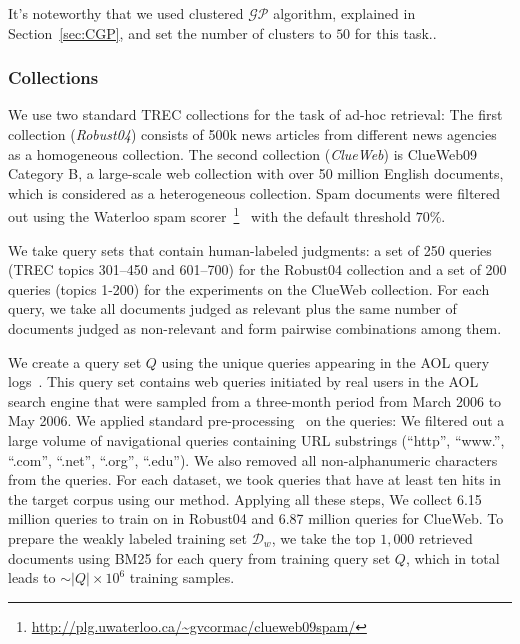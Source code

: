It's noteworthy that we used clustered $\mathcal{GP}$ algorithm, explained in Section~\ref{sec:CGP}, and set the number of clusters to $50$ for this task..  


\subsubsection{Collections}
We use two standard TREC collections for the task of ad-hoc retrieval: The first collection (\emph{Robust04}) consists of 500k news articles from different news agencies as a homogeneous collection. The second collection (\emph{ClueWeb}) is ClueWeb09 Category B, a large-scale web collection with over 50 million English documents, which is considered as a heterogeneous collection. Spam documents were filtered out using the Waterloo spam scorer~\footnote{\url{http://plg.uwaterloo.ca/~gvcormac/clueweb09spam/}}~\citep{Cormack:2011} with the default threshold $70\%$. 

We take query sets that contain human-labeled judgments: a set of 250 queries (TREC topics 301--450 and 601--700) for the Robust04 collection and a set of 200 queries (topics 1-200) for the experiments on the ClueWeb collection.
For each query, we take all documents judged as relevant plus the same number of documents judged as non-relevant and form pairwise combinations among them.

We create a query set $Q$ using the unique queries appearing in the AOL query logs~\citep{Pass:2006}. 
This query set contains web queries initiated by real users in the AOL search engine that were sampled from a three-month period from March 2006 to May 2006. 
We applied standard pre-processing~\cite{Dehghani:2017:SIGIR,Dehghani2017:CIKM} on the queries: We filtered out a large volume of navigational queries containing URL substrings (``http'', ``www.'', ``.com'', ``.net'', ``.org'', ``.edu''). We also removed all non-alphanumeric characters from the queries. For each dataset, we took queries that have at least ten hits in the target corpus using our \wa method. Applying all these steps, 
We collect 6.15 million queries to train on in Robust04 and 6.87 million queries for ClueWeb.
To prepare the weakly labeled training set $\mathcal{D}_w$, we take the top $1,000$ retrieved documents using BM25 for each query from training query set $Q$, which in total leads to $\sim|Q|\times 10^6$ training samples. 

